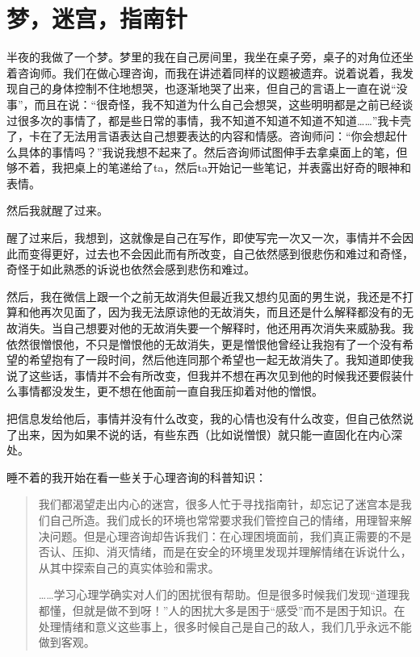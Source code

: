 \chapter{梦，迷宫，指南针}



半夜的我做了一个梦。梦里的我在自己房间里，我坐在桌子旁，桌子的对角位还坐着咨询师。我们在做心理咨询，而我在讲述着同样的议题\pozhehao{}被遗弃。说着说着，我发现自己的身体控制不住地想哭，也逐渐地哭了出来，但自己的言语上一直在说“没事”，而且在说：“很奇怪，我不知道为什么自己会想哭，这些明明都是之前已经谈过很多次的事情了，都是些日常的事情，我不知道不知道不知道不知道……”我卡壳了，卡在了无法用言语表达自己想要表达的内容和情感。咨询师问：“你会想起什么具体的事情吗？”我说我想不起来了。然后咨询师试图伸手去拿桌面上的笔，但够不着，我把桌上的笔递给了ta，然后ta开始记一些笔记，并表露出好奇的眼神和表情。

然后我就醒了过来。

醒了过来后，我想到，这就像是自己在写作，即使写完一次又一次，事情并不会因此而变得更好，过去也不会因此而有所改变，自己依然感到很悲伤和难过和奇怪，奇怪于如此熟悉的诉说也依然会感到悲伤和难过。

然后，我在微信上跟一个之前无故消失但最近我又想约见面的男生说，我还是不打算和他再次见面了，因为我无法原谅他的无故消失，而且还是什么解释都没有的无故消失。当自己想要对他的无故消失要一个解释时，他还用再次消失来威胁我。我依然很憎恨他，不只是憎恨他的无故消失，更是憎恨他曾经让我抱有了一个没有希望的希望抱有了一段时间，然后他连同那个希望也一起无故消失了。我知道即使我说了这些话，事情并不会有所改变，但我并不想在再次见到他的时候我还要假装什么事情都没发生，更不想在他面前一直自我压抑着对他的憎恨。

把信息发给他后，事情并没有什么改变，我的心情也没有什么改变，但自己依然说了出来，因为如果不说的话，有些东西（比如说憎恨）就只能一直固化在内心深处。

睡不着的我开始在看一些关于心理咨询的科普知识：

\blockquote{
	我们都渴望走出内心的迷宫，很多人忙于寻找指南针，却忘记了迷宫本是我们自己所造。我们成长的环境也常常要求我们管控自己的情绪，用理智来解决问题。但是心理咨询却告诉我们：在心理困境面前，我们真正需要的不是否认、压抑、消灭情绪，而是在安全的环境里发现并理解情绪在诉说什么，从其中探索自己的真实体验和需求。

	……学习心理学确实对人们的困扰很有帮助。但是很多时候我们发现“道理我都懂，但就是做不到呀！”人的困扰大多是困于“感受”而不是困于知识。在处理情绪和意义这些事上，很多时候自己是自己的敌人，我们几乎永远不能做到客观。
}


